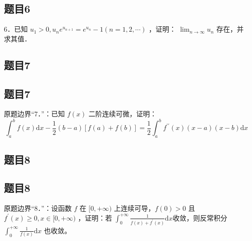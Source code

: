 \documentclass{article}
\begin{document}
\subsection{题目6}
6．已知 \(u_{1}>0, u_{n} e^{u_{n+1}}=e^{u_{n}}-1(n=1,2, \cdots)\) ，证明： \(\lim _{n \rightarrow \infty} u_{n}\) 存在，并求其值．

\begin{itemize}

\subsection{题目7}
\end{itemize}

\subsection{题目7}
原题边界“7．”：已知 \(f(x)\) 二阶连续可微，证明：
\[
\int_{a}^{b} f(x) \mathrm{d} x-\frac{1}{2}(b-a)[f(a)+f(b)]=\frac{1}{2} \int_{a}^{b} f^{\prime \prime}(x)(x-a)(x-b) \mathrm{d} x
\]

\subsection{题目8}

\subsection{题目8}
原题边界“8．”：设函数 \(f\) 在 \([0,+\infty)\) 上连续可导，\(f(0)>0\) 且 \(f^{\prime}(x) \geq 0, x \in[0,+\infty)\) ，证明：若 \(\int_{0}^{+\infty} \frac{1}{f(x)+f^{\prime}(x)} \mathrm{d} x\)收敛，则反常积分 \(\int_{0}^{+\infty} \frac{1}{f(x)} \mathrm{d} x\) 也收敛。
\end{document}
